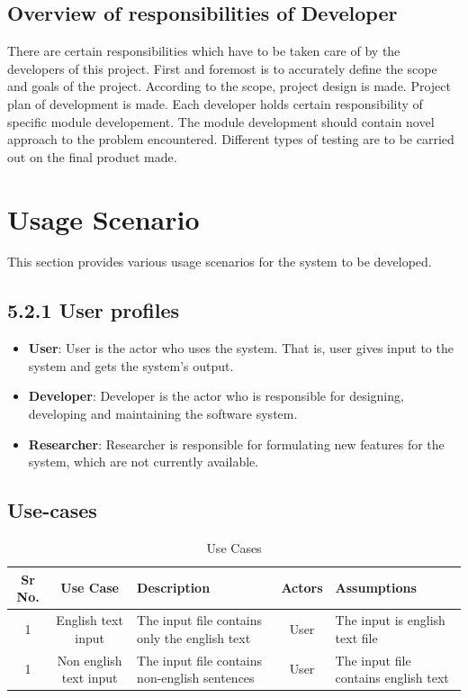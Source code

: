 \documentclass[oneside,a4paper,12pt]{book}
\begin{document}
\subsection{Overview of responsibilities of Developer}
There are certain responsibilities which have to be taken care of by the developers of this project. First and foremost is to accurately define the scope and goals of the project. According to the scope, project design is made. Project plan of development is made. Each developer holds certain responsibility of specific module developement. The module development should contain novel approach to the problem encountered. Different types of testing are to be carried out on the final product made.
  
\section{Usage Scenario}
This section provides various usage scenarios for the system to be developed.  
\subsection{5.2.1 User profiles}  
\begin{itemize}
	\item[] \textbf{User}: User is the actor who uses the system. That is, user gives input to the system and gets the system's output.
	\item[] \textbf{Developer}: Developer is the actor who is responsible for designing, developing and maintaining the software system.
	\item[] \textbf{Researcher}: Researcher is responsible for formulating new features for the system, which are not currently available.
\end{itemize}

\subsection{Use-cases}
\begin{table}[!htbp]
	\begin{center}
		\def\arraystretch{1.5}
		\begin{tabularx}{\textwidth}{| c | c | X | c | X |}
			\hline
			Sr No.	& Use Case	& Description	& Actors	& Assumptions \\
			\hline
			1& English text input & The input file contains only the english text & User & The input is english text file \\
			\hline
			1& Non english text input & The input file contains non-english sentences & User & The input file contains english text \\
			\hline
		\end{tabularx}
	\end{center}
	\caption{Use Cases}
	\label{tab:usecase}
\end{table}
\end{document}
